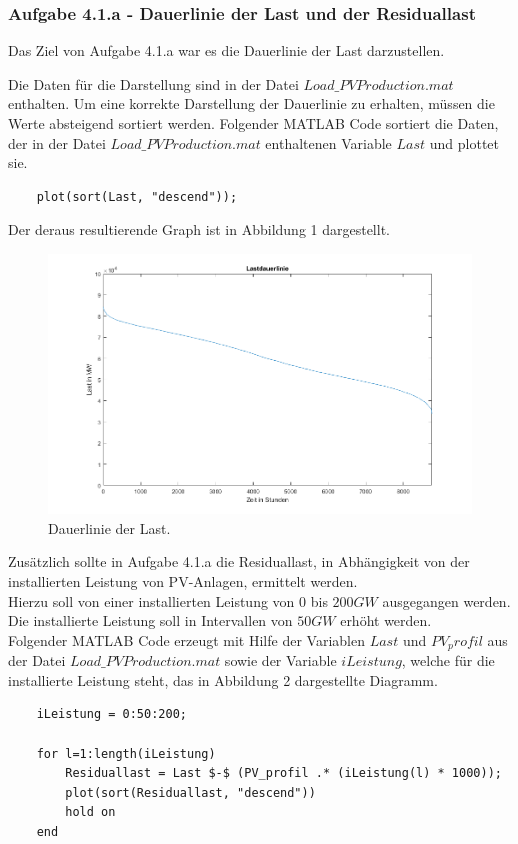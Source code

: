 \documentclass[a4paper,12pt]{article}
\begin{document}
	\subsubsection{Aufgabe 4.1.a - Dauerlinie der Last und der Residuallast}
	Das Ziel von Aufgabe 4.1.a war es die Dauerlinie der Last darzustellen.\\ \par
	\noindent Die Daten für die Darstellung sind in der Datei $Load\_PVProduction.mat$ enthalten. Um eine korrekte Darstellung der Dauerlinie zu erhalten, müssen die Werte absteigend sortiert werden.\newline
	Folgender MATLAB Code sortiert die Daten, der in der Datei $Load\_PVProduction.mat$ enthaltenen Variable $Last$ und plottet sie.
	\begin{lstlisting}
	plot(sort(Last, "descend"));
	\end{lstlisting}
	Der deraus resultierende Graph ist in Abbildung 1 dargestellt.
	\begin{figure}[H]
		\centering
		\includegraphics[width=12cm]{img/results/Lastdauerlinie}
		\caption{Dauerlinie der Last.}
	\end{figure}
	\noindent Zusätzlich sollte in Aufgabe 4.1.a die Residuallast, in Abhängigkeit von der installierten Leistung von PV-Anlagen, ermittelt werden.\\
	Hierzu soll von einer installierten Leistung von $0$ bis $200GW$ ausgegangen werden. Die installierte Leistung soll in Intervallen von $50GW$ erhöht werden.\\
	Folgender MATLAB Code erzeugt mit Hilfe der Variablen $Last$ und $PV_profil$ aus der Datei $Load\_PVProduction.mat$ sowie der Variable $iLeistung$, welche für die installierte Leistung steht, das in Abbildung 2 dargestellte Diagramm.
	\begin{lstlisting}
	iLeistung = 0:50:200;

	for l=1:length(iLeistung)
		Residuallast = Last $-$ (PV_profil .* (iLeistung(l) * 1000));
		plot(sort(Residuallast, "descend"))
		hold on
	end
	\end{lstlisting}
\end{document}
